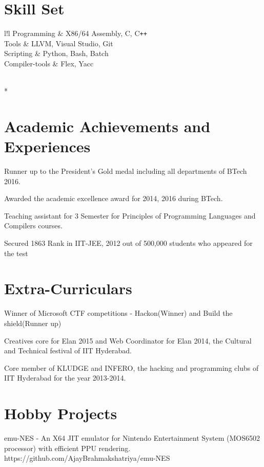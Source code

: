 \documentclass[10pt]{article}
\newcommand\VRule{\color{lightgray}\vrule width 0.5pt}
\begin{document}
\section*{Skill Set}
\begin{tabular}{l!{\VRule}l}
Programming		&	X86/64 Assembly, C, C\texttt{++}\\
Tools			&	LLVM, Visual Studio, Git\\
Scripting		&	Python, Bash, Batch\\
Compiler-tools  &   Flex, Yacc
\end{tabular}
 \\*

\section*{Academic Achievements and Experiences}
\begin{compactitem}
\item Runner up to the President's Gold medal including all departments of BTech 2016. 
\item Awarded the academic excellence award for 2014, 2016 during BTech. 
\item Teaching assistant for 3 Semester for Principles of Programming Languages and Compilers courses.
\item Secured 1863 Rank in IIT-JEE, 2012 out of 500,000 students who appeared for the test
\end{compactitem}


\section*{Extra-Curriculars}
\begin{compactitem}
\item Winner of Microsoft CTF competitions - Hackon(Winner) and Build the shield(Runner up)
\item Creatives core for Elan 2015 and Web Coordinator for Elan 2014, the Cultural and Technical festival of IIT Hyderabad.
\item Core member of KLUDGE and INFERO, the hacking and programming clubs of IIT Hyderabad for the year 2013-2014.
\end{compactitem}


\section*{Hobby Projects} 
\begin{compactitem}
\item emu-NES - An X64 JIT emulator for Nintendo Entertainment System (MOS6502 processor) with efficient PPU rendering. \\ https://github.com/AjayBrahmakshatriya/emu-NES
\end{compactitem}
\end{document}
